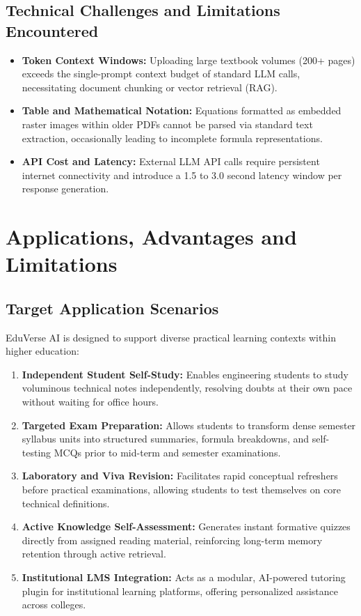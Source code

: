 \documentclass[11pt,a4paper]{report}
\begin{document}
\section{Technical Challenges and Limitations Encountered}
\begin{itemize}[noitemsep, topsep=2pt]
    \item \textbf{Token Context Windows:} Uploading large textbook volumes (200+ pages) exceeds the single-prompt context budget of standard LLM calls, necessitating document chunking or vector retrieval (RAG).
    \item \textbf{Table and Mathematical Notation:} Equations formatted as embedded raster images within older PDFs cannot be parsed via standard text extraction, occasionally leading to incomplete formula representations.
    \item \textbf{API Cost and Latency:} External LLM API calls require persistent internet connectivity and introduce a 1.5 to 3.0 second latency window per response generation.
\end{itemize}
\clearpage

\chapter{Applications, Advantages and Limitations}
\label{ch:applications}

\section{Target Application Scenarios}
EduVerse AI is designed to support diverse practical learning contexts within higher education:
\begin{enumerate}[topsep=2pt, itemsep=4pt]
    \item \textbf{Independent Student Self-Study:} Enables engineering students to study voluminous technical notes independently, resolving doubts at their own pace without waiting for office hours.
    \item \textbf{Targeted Exam Preparation:} Allows students to transform dense semester syllabus units into structured summaries, formula breakdowns, and self-testing MCQs prior to mid-term and semester examinations.
    \item \textbf{Laboratory and Viva Revision:} Facilitates rapid conceptual refreshers before practical examinations, allowing students to test themselves on core technical definitions.
    \item \textbf{Active Knowledge Self-Assessment:} Generates instant formative quizzes directly from assigned reading material, reinforcing long-term memory retention through active retrieval.
    \item \textbf{Institutional LMS Integration:} Acts as a modular, AI-powered tutoring plugin for institutional learning platforms, offering personalized assistance across colleges.
\end{enumerate}
\end{document}
